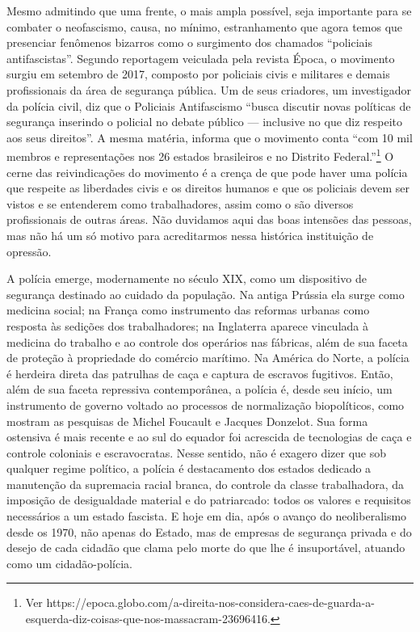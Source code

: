 Mesmo admitindo que uma frente, o mais ampla possível, seja importante para se combater o neofascismo, causa, no mínimo, estranhamento que agora temos que presenciar fenômenos bizarros como o surgimento dos chamados “policiais antifascistas”. Segundo reportagem veiculada pela revista Época, o movimento surgiu em setembro de 2017, composto por policiais civis e militares e demais profissionais da área de segurança pública. Um de seus criadores, um investigador da polícia civil, diz que o Policiais Antifascismo “busca discutir novas políticas de segurança inserindo o policial no debate público — inclusive no que diz respeito aos seus direitos”. A mesma matéria, informa que o movimento conta “com 10 mil membros e representações nos 26 estados brasileiros e no Distrito Federal.”\footnote{Ver https://epoca.globo.com/a-direita-nos-considera-caes-de-guarda-a-esquerda-diz-coisas-que-nos-massacram-23696416.} O cerne das reivindicações do movimento é a crença de que pode haver uma polícia que respeite as liberdades civis e os direitos humanos e que os policiais devem ser vistos e se entenderem como trabalhadores, assim como o são diversos profissionais de outras áreas. Não duvidamos aqui das boas intensões das pessoas, mas não há um só motivo para acreditarmos nessa histórica instituição de opressão.

A polícia emerge, modernamente no século XIX, como um dispositivo de segurança destinado ao cuidado da população. Na antiga Prússia ela surge como medicina social; na França como instrumento das reformas urbanas como resposta às sedições dos trabalhadores; na Inglaterra aparece vinculada à medicina do trabalho e ao controle dos operários nas fábricas, além de sua faceta de proteção à propriedade do comércio marítimo. Na América do Norte, a polícia é herdeira direta das patrulhas de caça e captura de escravos fugitivos. Então, além de sua faceta repressiva contemporânea, a polícia é, desde seu início, um instrumento de governo voltado ao processos de normalização biopolíticos, como mostram as pesquisas de Michel Foucault e Jacques Donzelot. Sua forma ostensiva é mais recente e ao sul do equador foi acrescida de tecnologias de caça e controle coloniais e escravocratas. Nesse sentido, não é exagero dizer que sob qualquer regime político, a polícia é destacamento dos estados dedicado a manutenção da supremacia racial branca, do controle da classe trabalhadora, da imposição de desigualdade material e do patriarcado: todos os valores e requisitos necessários a um estado fascista. E hoje em dia, após o avanço do neoliberalismo desde os 1970, não apenas do Estado, mas de empresas de segurança privada e do desejo de cada cidadão que clama pelo morte do que lhe é insuportável, atuando como um cidadão-polícia.

